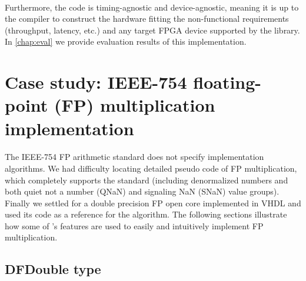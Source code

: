 \paragraph{}Furthermore, the code is timing-agnostic and device-agnostic, meaning it is up to the compiler to construct the hardware fitting the non-functional requirements (throughput, latency, etc.) and any target FPGA device supported by the library. In \autoref{chap:eval} we provide evaluation results of this implementation.
\section{Case study: IEEE-754 floating-point (FP) multiplication implementation}
\paragraph{}The IEEE-754 FP arithmetic standard \cite{ieee2008754} does not specify implementation algorithms. We had difficulty locating detailed pseudo code of FP multiplication, which completely supports the standard (including denormalized numbers and both quiet not a number (QNaN) and signaling NaN (SNaN) value groups). Finally we settled for a double precision FP open core implemented in VHDL \cite{lundgren2014open} and used its code as a reference for the algorithm. The following sections illustrate how some of \cfns's features are used to easily and intuitively implement FP multiplication. 

\subsection*{DFDouble type}
